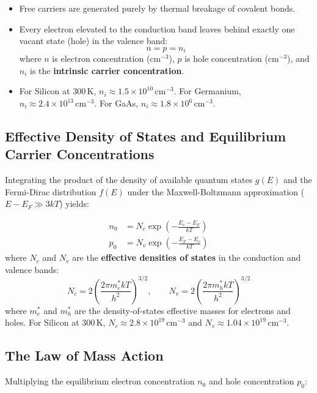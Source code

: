 \documentclass[12pt,a4paper]{article}
\begin{document}
\begin{itemize}[leftmargin=*, itemsep=3pt]
  \item Free carriers are generated purely by thermal breakage of covalent bonds.
  \item Every electron elevated to the conduction band leaves behind exactly one vacant state (hole) in the valence band:
  \begin{equation}
    n = p = n_i
  \end{equation}
  where $n$ is electron concentration ($\text{cm}^{-3}$), $p$ is hole concentration ($\text{cm}^{-3}$), and $n_i$ is the \textbf{intrinsic carrier concentration}.
  \item For Silicon at $300\,\text{K}$, $n_i \approx 1.5 \times 10^{10}\,\text{cm}^{-3}$. For Germanium, $n_i \approx 2.4 \times 10^{13}\,\text{cm}^{-3}$. For GaAs, $n_i \approx 1.8 \times 10^6\,\text{cm}^{-3}$.
\end{itemize}

\subsection{Effective Density of States and Equilibrium Carrier Concentrations}
Integrating the product of the density of available quantum states $g(E)$ and the Fermi-Dirac distribution $f(E)$ under the Maxwell-Boltzmann approximation ($E - E_F \gg 3kT$) yields:

\begin{tcolorbox}[formulabox, title={\textbf{Equilibrium Carrier Concentrations and Effective Densities of States}}]
\begin{align}
  n_0 &= N_c \exp\left(-\frac{E_c - E_F}{k T}\right) \\
  p_0 &= N_v \exp\left(-\frac{E_F - E_v}{k T}\right)
\end{align}
where $N_c$ and $N_v$ are the \textbf{effective densities of states} in the conduction and valence bands:
\begin{equation}
  N_c = 2\left(\frac{2\pi m_e^* k T}{h^2}\right)^{3/2}, \qquad N_v = 2\left(\frac{2\pi m_h^* k T}{h^2}\right)^{3/2}
\end{equation}
where $m_e^*$ and $m_h^*$ are the density-of-states effective masses for electrons and holes. For Silicon at $300\,\text{K}$, $N_c \approx 2.8 \times 10^{19}\,\text{cm}^{-3}$ and $N_v \approx 1.04 \times 10^{19}\,\text{cm}^{-3}$.
\end{tcolorbox}

\subsection{The Law of Mass Action}
Multiplying the equilibrium electron concentration $n_0$ and hole concentration $p_0$:
\end{document}
